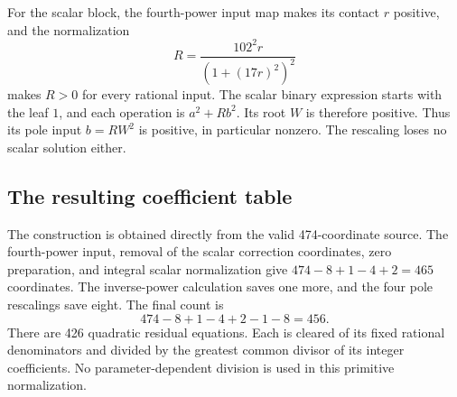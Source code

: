 \documentclass[11pt,a4paper]{article}
\theoremstyle{definition}
\theoremstyle{remark}
\begin{document}
For the scalar block, the fourth-power input map makes its contact
$r$ positive, and the normalization
\[
                    R=\frac{102^2r}{(1+(17r)^2)^2}
\]
makes $R>0$ for every rational input. The scalar binary expression
starts with the leaf $1$, and each operation is $a^2+Rb^2$.
Its root $W$ is therefore positive. Thus its pole input $b=RW^2$
is positive, in particular nonzero. The rescaling loses no scalar
solution either.

\subsection{The resulting coefficient table}

The construction is obtained directly from the valid 474-coordinate
source. The fourth-power input, removal of the scalar correction
coordinates, zero preparation, and integral scalar normalization give
$474-8+1-4+2=465$ coordinates. The inverse-power calculation saves
one more, and the four pole rescalings save eight. The final count is
\[
                         474-8+1-4+2-1-8=456.
\]
There are 426 quadratic residual equations. Each is cleared of its
fixed rational denominators and divided by the greatest common divisor
of its integer coefficients. No parameter-dependent division is used
in this primitive normalization.
\end{document}
